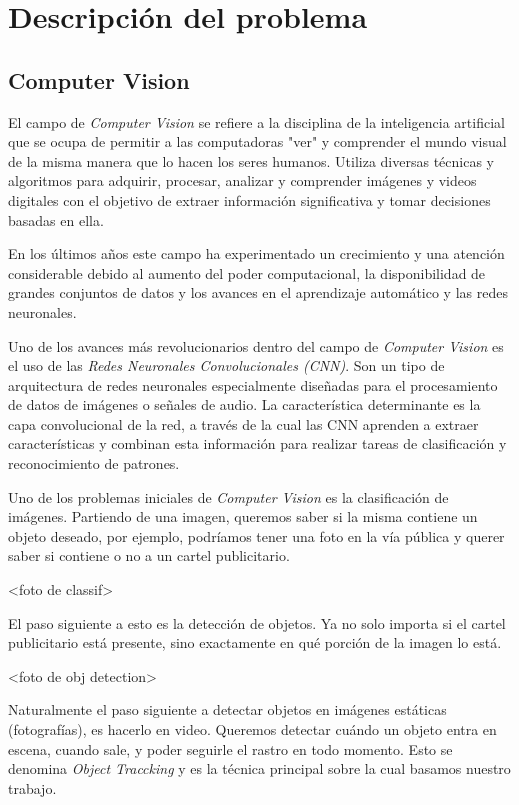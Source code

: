 \documentclass[a4paper]{article}
\begin{document}
\section{Descripción del problema}
\subsection{Computer Vision}
El campo de \emph{Computer Vision} se refiere a la disciplina de la inteligencia artificial que se ocupa de permitir a las computadoras "ver" y comprender el mundo visual de la misma manera que lo hacen los seres humanos. Utiliza diversas técnicas y algoritmos para adquirir, procesar, analizar y comprender imágenes y videos digitales con el objetivo de extraer información significativa y tomar decisiones basadas en ella.

En los últimos años este campo ha experimentado un crecimiento y una atención considerable debido al aumento del poder computacional, la disponibilidad de grandes conjuntos de datos y los avances en el aprendizaje automático y las redes neuronales.

Uno de los avances más revolucionarios dentro del campo de \emph{Computer Vision} es el uso de las \emph{Redes Neuronales Convolucionales (CNN)}. Son un tipo de arquitectura de redes neuronales especialmente diseñadas para el procesamiento de datos de imágenes o señales de audio. La característica determinante es la capa convolucional de la red, a través de la cual las CNN aprenden a extraer características y combinan esta información para realizar tareas de clasificación y reconocimiento de patrones.

Uno de los problemas iniciales de \emph{Computer Vision} es la clasificación de imágenes. Partiendo de una imagen, queremos saber si la misma contiene un objeto deseado, por ejemplo, podríamos tener una foto en la vía pública y querer saber si contiene o no a un cartel publicitario.

<foto de classif>

El paso siguiente a esto es la detección de objetos. Ya no solo importa si el cartel publicitario está presente, sino exactamente en qué porción de la imagen lo está.

<foto de obj detection>

Naturalmente el paso siguiente a detectar objetos en imágenes estáticas (fotografías), es hacerlo en video. Queremos detectar cuándo un objeto entra en escena, cuando sale, y poder seguirle el rastro en todo momento. Esto se denomina \emph{Object Traccking} y es la técnica principal sobre la cual basamos nuestro trabajo.
\end{document}
